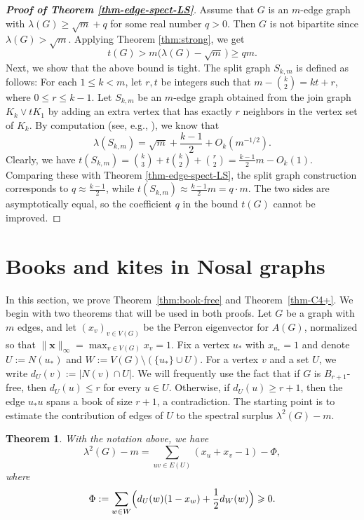 \documentclass[11pt,a4paper]{article}
\newtheorem{theorem}{Theorem}[section]
\theoremstyle{definition}
\theoremstyle{plain}
\renewcommand{\le}{\leqslant}
\renewcommand{\ge}{\geqslant}
\begin{document}
\begin{proof}[{\bf Proof of Theorem \ref{thm-edge-spect-LS}}]
    Assume that $G$ is an $m$-edge graph with $\lambda (G)\ge \sqrt{m} +q$ for some real number $q>0$. Then $G$ is not bipartite since $\lambda (G)> \sqrt{m}$. 
    Applying Theorem \ref{thm:strong}, we get 
    $$ t (G)> m \big( \lambda (G)- \sqrt{m}\, \big)\ge qm. $$
    Next, we show that 
the above bound is tight. The split graph $S_{k,m}$ is defined as follows: For each $1\le k<m$, let $r,t$ be integers such that $m- {k \choose 2}= k t + r$, where $0\le r\le k-1$. 
Let $S_{k,m}$ be an $m$-edge graph 
obtained from the join graph $K_{k}\vee tK_1$ by adding an extra vertex that has exactly $r$ neighbors in the vertex set of $K_k$. By computation (see, e.g., \cite[Lemma 3.3]{LLLZ2026}), we know that 
$$ \lambda (S_{k,m})=\sqrt{m} + \frac{k-1}{2} + O_k(m^{-1/2}). $$
Clearly, we have  $t(S_{k,m})= {k \choose 3} + t {k \choose 2} + {r \choose 2} = \frac{k-1}{2}m-O_k(1)$.  
Comparing these with Theorem \ref{thm-edge-spect-LS}, the split graph  construction corresponds to $q\approx \frac{k-1}{2}$, while $t(S_{k,m})\approx \frac{k-1}{2}m = q\cdot m$. The two sides are asymptotically equal, 
so the coefficient $q$ in the bound $t(G)$ cannot be improved. 
\end{proof} 



\section{Books and kites in Nosal graphs}
\label{sec:4}

In this section, we prove Theorem~\ref{thm:book-free} and Theorem~\ref{thm-C4+}.
We begin with two theorems that will be used in both proofs. 
Let $G$ be a graph with $m$ edges, and let $(x_v)_{v\in V(G)}$ be the Perron eigenvector for $A(G)$, normalized so that $\| \bm{x}\|_{\infty} = \max_{v\in V(G)}x_v=1$. 
Fix a vertex $u_*$ with $x_{u_*}=1$ and denote $U:=N(u_*)$ and $W:=V(G)\setminus (\{u_*\}\cup U)$.  
For a vertex $v$ and a set $U$, we write $d_U(v):=|N(v)\cap U|$.   
We will frequently use the fact that if $G$ is $B_{r+1}$-free, then  $d_U(u)\le r$ for every $u\in U$. Otherwise, if $d_U(u)\ge r+1$, then the edge $u_*u$ spans a book of size $r+1$, a contradiction. 
The starting point is to estimate the contribution of edges of $U$ to the spectral surplus $\lambda^2(G)-m$.

\begin{theorem} \label{thm:identity}
With the notation above, we have 
\[
\lambda^2(G)-m=\sum_{uv\in E(U)}(x_u+x_v-1)-\Phi,
\]
where
\[
\Phi:=\sum_{w\in W}\Bigl(d_U(w)(1-x_w)+\frac12 d_W(w)\Bigr) \ge 0.
\]
\end{theorem}
\end{document}
